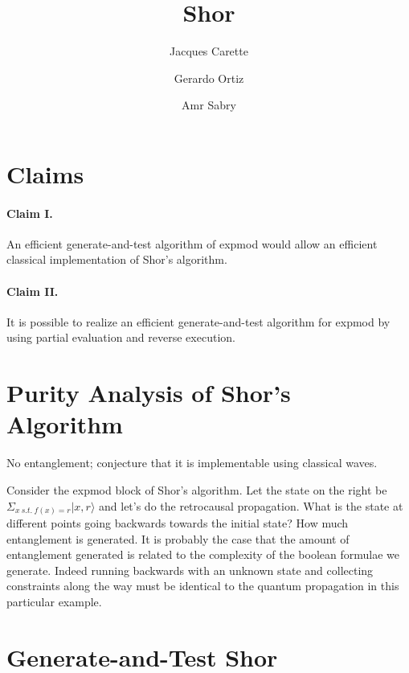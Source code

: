 \documentclass{article}
\title{Shor}
\author{Jacques Carette \and Gerardo Ortiz \and Amr Sabry}
\begin{document}
\maketitle

\newcommand{\st}[5]{\ensuremath{| #1, #2, #3, #4, #5 \rangle}}
\newcommand{\ket}[1]{\ensuremath{| #1 \rangle}}

\section{Claims}

\paragraph*{Claim I.}
An efficient generate-and-test algorithm of expmod would allow an
efficient classical implementation of Shor's algorithm.

\paragraph*{Claim II.}
It is possible to realize an efficient generate-and-test algorithm for
expmod by using partial evaluation and reverse execution.

\section{Purity Analysis of Shor's Algorithm}

No entanglement; conjecture that it is implementable using classical waves. 

Consider the expmod block of Shor's algorithm. Let the state on the
right be $\Sigma_{x~s.t.~f(x) = r} \ket{x,r}$ and let's do the
retrocausal propagation. What is the state at different points going
backwards towards the initial state? How much entanglement is
generated. It is probably the case that the amount of entanglement
generated is related to the complexity of the boolean formulae we
generate. Indeed running backwards with an unknown state and
collecting constraints along the way must be identical to the quantum
propagation in this particular example.

\section{Generate-and-Test Shor}
\end{document}

